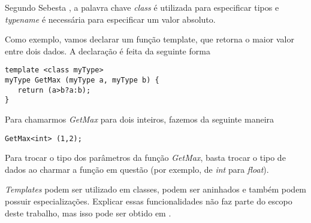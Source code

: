 Segundo Sebesta \cite{sebesta}, a palavra chave \emph{class} é utilizada para especificar tipos e \emph{typename} é necessária para especificar um valor absoluto.

Como exemplo, vamos declarar um função template, que retorna o maior valor entre dois dados. A declaração é feita da seguinte forma
\begin{verbatim}
template <class myType>
myType GetMax (myType a, myType b) {
   return (a>b?a:b);
}
\end{verbatim}

Para chamarmos \emph{GetMax} para dois inteiros, fazemos da seguinte maneira
\begin{verbatim}
GetMax<int> (1,2);
\end{verbatim}

Para trocar o tipo dos parâmetros da função \emph{GetMax}, basta trocar o tipo de dados ao charmar a função em questão (por exemplo, de \emph{int} para \emph{float}).

\emph{Templates} podem ser utilizado em classes, podem ser aninhados e também podem possuir especializações. Explicar essas funcionalidades não faz parte do escopo deste trabalho, mas isso pode ser obtido em \cite{template_cpluplus}.

